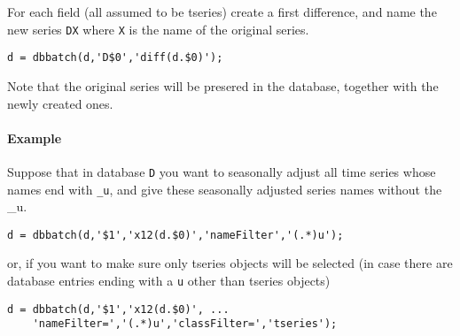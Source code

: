 For each field (all assumed to be tseries) create a first difference,
and name the new series \texttt{DX} where \texttt{X} is the name of the
original series.

\begin{verbatim}
d = dbbatch(d,'D$0','diff(d.$0)');
\end{verbatim}

Note that the original series will be presered in the database, together
with the newly created ones.

\paragraph{Example}

Suppose that in database \texttt{D} you want to seasonally adjust all
time series whose names end with \texttt{\_u}, and give these seasonally
adjusted series names without the \_u.

\begin{verbatim}
d = dbbatch(d,'$1','x12(d.$0)','nameFilter','(.*)u');
\end{verbatim}

or, if you want to make sure only tseries objects will be selected (in
case there are database entries ending with a \texttt{u} other than
tseries objects)

\begin{verbatim}
d = dbbatch(d,'$1','x12(d.$0)', ...
    'nameFilter=','(.*)u','classFilter=','tseries');
\end{verbatim}


